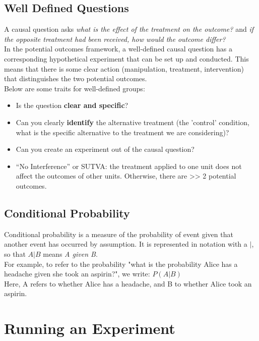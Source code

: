 \documentclass{article}
\begin{document}
\subsection{Well Defined Questions}
A causal question asks \textit{what is the effect of the treatment on the outcome?} and \textit{if the opposite treatment had been received, how would the outcome differ?} \\
In the potential outcomes framework, a well-defined causal question has a corresponding hypothetical experiment that can be set up and conducted.
This means that there is some clear action (manipulation, treatment, intervention) that distinguishes the two potential outcomes.
\\
Below are some traits for well-defined groups:
\begin{itemize}
    \item Is the question \textbf{clear and specific}?
    \item Can you clearly \textbf{identify} the alternative treatment (the 'control' condition, what is the specific alternative to the treatment we are considering)?
    \item Can you create an experiment out of the causal question?
    \item “No Interference” or SUTVA: the treatment applied to one unit does not affect the outcomes of other units. Otherwise, there are >> 2 potential outcomes.
\end{itemize}

\subsection{Conditional Probability}
Conditional probability is a measure of the probability of event given that another event has occurred by assumption. It is represented in notation with a $|$, so that $A|B$ means \textit{A given B}.
\\
For example, to refer to the probability "what is the probability Alice has a headache given she took an aspirin?", we write: $P(A|B)$ \\
Here, A refers to whether Alice has a headache, and B to whether Alice took an aspirin.


\section{Running an Experiment}
\end{document}
